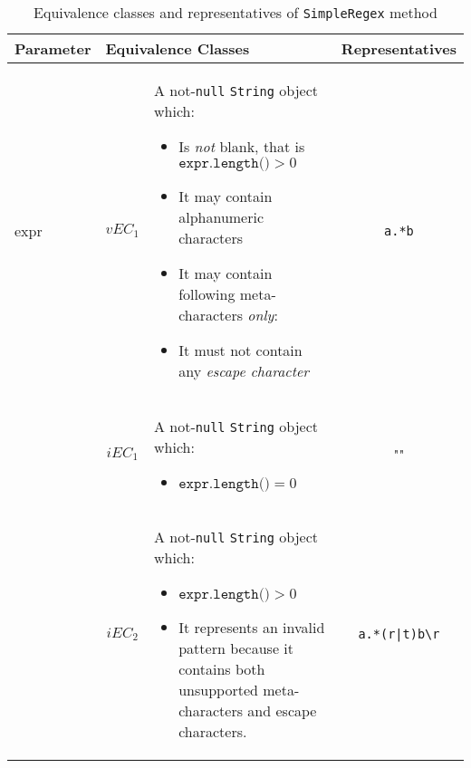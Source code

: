 \documentclass[sigconf]{acmart}
\begin{document}
\begin{table*}
\footnotesize
\caption{Equivalence classes and representatives of \texttt{SimpleRegex} method}
\label{SimpleRegexEq}
\centering
\begin{threeparttable}[b]
\begin{tabular}{l|cm{10.5cm}|c}
\toprule
 
\textbf{Parameter} & \multicolumn{2}{|l|}{\textbf{Equivalence Classes}} & \textbf{Representatives} \\
\midrule
    
expr & $vEC_1$ & A not-\texttt{null} \texttt{String} object which:

 \begin{itemize}
\item Is \textit{not} blank, that is $\texttt{expr.length()} > 0$ \tnote{[1]}
\item It may contain alphanumeric characters
\item It may contain following meta-characters \textit{only}: \tnote{[2]}
\begin{description}
\item[\texttt{.}]
\item[\texttt{.*}]
\end{description}
\item It must not contain any \textit{escape character} \tnote{[3]}
\end{itemize}

& \texttt{a.*b}

\\\cline{2-4}

& $iEC_1$ & A not-\texttt{null} \texttt{String} object which: 

 \begin{itemize}
\item $\texttt{expr.length()} = 0$
\end{itemize}

& ""

\\\cline{2-4}

& $iEC_2$ & A not-\texttt{null} \texttt{String} object which: 

 \begin{itemize}
\item $\texttt{expr.length()} > 0$
\item It represents an invalid pattern because it contains both unsupported meta-characters and escape characters.
\end{itemize}

& \texttt{a.*(r|t)b\textbackslash r}


\end{tabular}
\end{threeparttable}
\end{table*}
\end{document}
